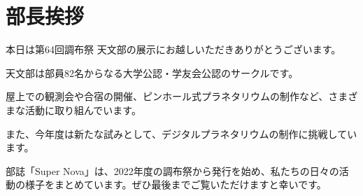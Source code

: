 \documentclass[../super_nova_20yy]{subfiles}
\begin{document}
\chapter{部長挨拶}
\vspace{5\zw}
\begin{center}

	\phantom{a}\par

	本日は第64回調布祭 天文部の展示にお越しいただきありがとうございます。

	\phantom{a}\par

	天文部は部員82名からなる大学公認・学友会公認のサークルです。

	\phantom{a}\par
	屋上での観測会や合宿の開催、ピンホール式プラネタリウムの制作など、さまざまな活動に取り組んでいます。

	\phantom{a}\par
	また、今年度は新たな試みとして、デジタルプラネタリウムの制作に挑戦しています。

	\phantom{a}\par

	部誌「Super Nova」は、2022年度の調布祭から発行を始め、私たちの日々の活動の様子をまとめています。ぜひ最後までご覧いただけますと幸いです。

\end{center}
\vspace{5\zw}
\end{document}
